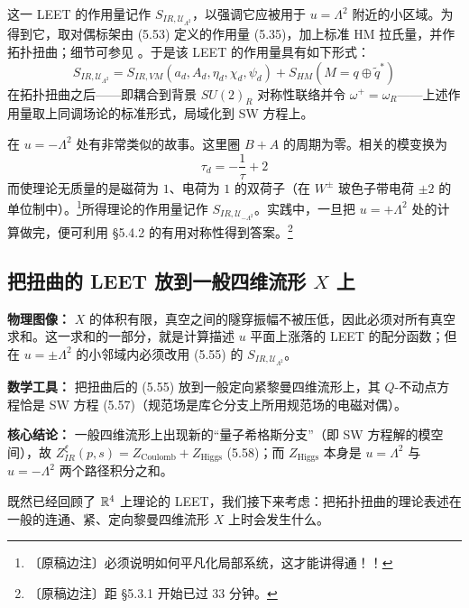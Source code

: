 这一 LEET 的作用量记作 $S_{IR,\mathcal{U}_{\Lambda^{2}}}$，以强调它应被用于 $u=\Lambda^{2}$ 附近的小区域。为得到它，取对偶标架由 (5.53) 定义的作用量 (5.35)，加上标准 HM 拉氏量，并作拓扑扭曲；细节可参见 \cite{ref24}。于是该 LEET 的作用量具有如下形式：
\begin{equation}
S_{IR,\mathcal{U}_{\Lambda^{2}}}
=S_{IR,VM}(a_{d},A_{d},\eta_{d},\chi_{d},\psi_{d})
+S_{HM}(M=q\oplus\tilde q^{*})
\tag{5.55}
\end{equation}
在拓扑扭曲之后——即耦合到背景 $SU(2)_{R}$ 对称性联络并令 $\omega^{+}=\omega_{R}$——上述作用量取上同调场论的标准形式，局域化到 SW 方程上。

在 $u=-\Lambda^{2}$ 处有非常类似的故事。这里圈 $B+A$ 的周期为零。相关的模变换为
\begin{equation}
\tau_{d}=-\frac{1}{\tau}+2
\tag{5.56}
\end{equation}
而使理论无质量的是磁荷为 $1$、电荷为 $1$ 的双荷子（在 $W^{\pm}$ 玻色子带电荷 $\pm2$ 的单位制中）。\footnote{〔原稿边注〕必须说明如何平凡化局部系统，这才能讲得通！！}所得理论的作用量记作 $S_{IR,\mathcal{U}_{-\Lambda^{2}}}$。实践中，一旦把 $u=+\Lambda^{2}$ 处的计算做完，便可利用 §5.4.2 的有用对称性得到答案。\footnote{〔原稿边注〕距 §5.3.1 开始已过 33 分钟。}

\subsection{把扭曲的 LEET 放到一般四维流形 $X$ 上}

\begin{keytakeaways}
\item \textbf{物理图像：} $X$ 的体积有限，真空之间的隧穿振幅不被压低，因此必须对所有真空求和。这一求和的一部分，就是计算描述 $u$ 平面上涨落的 LEET 的配分函数；但在 $u=\pm\Lambda^{2}$ 的小邻域内必须改用 (5.55) 的 $S_{IR,\mathcal{U}_{\Lambda^{2}}}$。
\item \textbf{数学工具：} 把扭曲后的 (5.55) 放到一般定向紧黎曼四维流形上，其 $Q$-不动点方程恰是 SW 方程 (5.57)（规范场是库仑分支上所用规范场的电磁对偶）。
\item \textbf{核心结论：} 一般四维流形上出现新的“量子希格斯分支”（即 SW 方程解的模空间），故 $Z^{\xi}_{IR}(p,s)=Z_{\text{Coulomb}}+Z_{\text{Higgs}}$ (5.58)；而 $Z_{\text{Higgs}}$ 本身是 $u=\Lambda^{2}$ 与 $u=-\Lambda^{2}$ 两个路径积分之和。
\end{keytakeaways}

既然已经回顾了 $\mathbb{R}^{4}$ 上理论的 LEET，我们接下来考虑：把拓扑扭曲的理论表述在一般的连通、紧、定向黎曼四维流形 $X$ 上时会发生什么。


